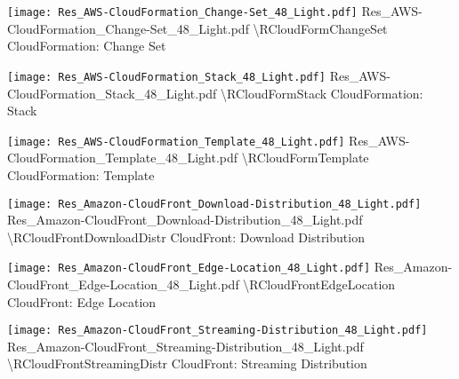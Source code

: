  {\texttt{[image: Res\_AWS-CloudFormation\_Change-Set\_48\_Light.pdf]}} {Res\_AWS-CloudFormation\_Change-Set\_48\_Light.pdf} {{\textbackslash}RCloudFormChangeSet} {CloudFormation: Change Set}

 {\texttt{[image: Res\_AWS-CloudFormation\_Stack\_48\_Light.pdf]}} {Res\_AWS-CloudFormation\_Stack\_48\_Light.pdf} {{\textbackslash}RCloudFormStack} {CloudFormation: Stack}

 {\texttt{[image: Res\_AWS-CloudFormation\_Template\_48\_Light.pdf]}} {Res\_AWS-CloudFormation\_Template\_48\_Light.pdf} {{\textbackslash}RCloudFormTemplate} {CloudFormation: Template}

 {\texttt{[image: Res\_Amazon-CloudFront\_Download-Distribution\_48\_Light.pdf]}} {Res\_Amazon-CloudFront\_Download-Distribution\_48\_Light.pdf} {{\textbackslash}RCloudFrontDownloadDistr} {CloudFront: Download Distribution}

 {\texttt{[image: Res\_Amazon-CloudFront\_Edge-Location\_48\_Light.pdf]}} {Res\_Amazon-CloudFront\_Edge-Location\_48\_Light.pdf} {{\textbackslash}RCloudFrontEdgeLocation} {CloudFront: Edge Location}

 {\texttt{[image: Res\_Amazon-CloudFront\_Streaming-Distribution\_48\_Light.pdf]}} {Res\_Amazon-CloudFront\_Streaming-Distribution\_48\_Light.pdf} {{\textbackslash}RCloudFrontStreamingDistr} {CloudFront: Streaming Distribution}

